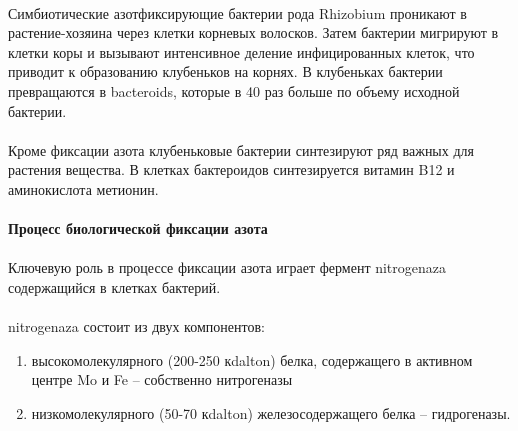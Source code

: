 

\paragraph*{}Симбиотические азотфиксирующие бактерии рода \hypertarget{nitrificators}{Rhizobium} проникают в растение-хозяина через клетки корневых волосков. Затем бактерии мигрируют в клетки коры и вызывают интенсивное деление инфицированных клеток, что приводит к образованию клубеньков на корнях. В клубеньках бактерии превращаются в \gls{bacteroids}, которые в 40 раз больше по объему исходной бактерии. 

\paragraph*{}Кроме фиксации азота клубеньковые бактерии синтезируют ряд важных для растения вещества. В клетках бактероидов синтезируется витамин B12 и аминокислота метионин.


\paragraph*{Процесс биологической фиксации азота}

\paragraph*{}Ключевую роль в процессе фиксации азота играет фермент \hypertarget{nitrogenaza}{\gls{nitrogenaza}} содержащийся в клетках бактерий.


\paragraph*{}\gls{nitrogenaza} состоит из двух компонентов: 
\begin{enumerate}
\item высокомолекулярного (200-250 к\gls{dalton}) белка, содержащего в активном центре Mo и Fe -- собственно нитрогеназы
\item низкомолекулярного (50-70 к\gls{dalton}) железосодержащего белка -- гидрогеназы.
\end{enumerate}


